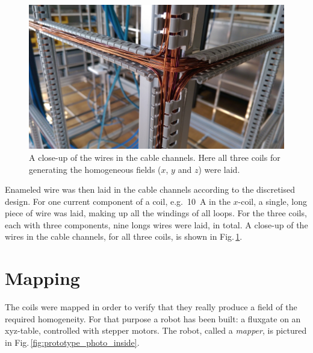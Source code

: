 
\begin{figure}
  \centering
  \includegraphics[width=0.9\linewidth]{gfx/prototype/wires_close_up.jpg}
  \caption{A close-up of the wires in the cable channels. Here all three coils for generating the homogeneous fields ($x$, $y$ and $z$) were laid.}\label{fig:prototype_coil_wire_close-up}
\end{figure}

Enameled wire was then laid in the cable channels according to the discretised design. For one current component of a coil, e.g.\ \SI[detect-all = true]{10}{\ampere} in the $x$-coil, a single, long piece of wire was laid, making up all the windings of all loops. For the three coils, each with three components, nine longs wires were laid, in total.
A close-up of the wires in the cable channels, for all three coils, is shown in Fig.\,\ref{fig:prototype_coil_wire_close-up}.




\section{Mapping}
The coils were mapped in order to verify that they really produce a field of the required homogeneity. For that purpose a robot has been built: a fluxgate on an xyz-table, controlled with stepper motors. The robot, called a \emph{mapper}, is pictured in Fig.\,\ref{fig:prototype_photo_inside}.

